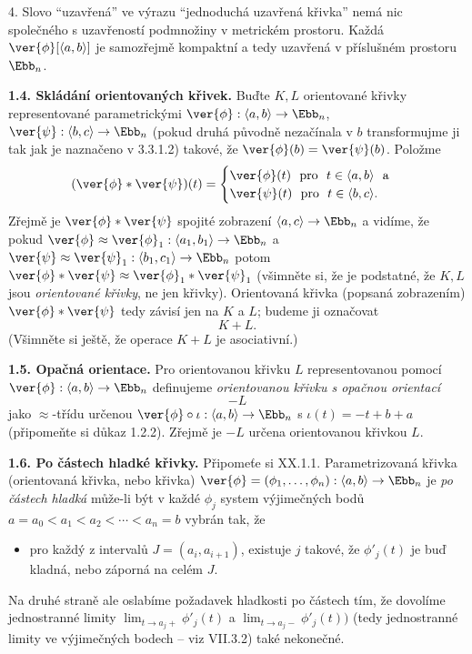 \documentclass[12pt]{article}
\begin{document}
 4. Slovo ``uzavřená'' ve výrazu  ``jednoduchá uzavřená křivka'' nemá nic společného s uzavřeností podmnožiny v metrickém prostoru. Každá
$\ver{\phi}[\langle a,b\rangle]$ je samozřejmě kompaktní a tedy uzavřená v příslušném prostoru 
$\Ebb_n$.
 
 \bigskip
 
{\bf 1.4. Skládání orientovaných křivek.} Buďte $K,L$ orientované křivky representované parametrickými  $\ver{\phi}:\langle a,b\rangle\to\Ebb_n$, 
  $\ver{\psi}:\langle b,c\rangle\to\Ebb_n$ (pokud druhá původně nezačínala v  $b$ transformujme ji tak jak je naznačeno v 3.3.1.2)
 takové, že $\ver{\phi}(b)=\ver{\psi}(b)$. Položme
    $$
  (\ver{\phi}*\ver{\psi})(t)=\begin{cases}\ver{\phi}(t)\ \ \text{pro}\ \ t\in\langle a,b\rangle\ \ \text{a}\\
                                      \ver{\psi}(t)\ \ \text{pro}\ \ t\in\langle b,c\rangle.
                                      \end{cases}
  $$ 
  Zřejmě je $\ver{\phi}*\ver{\psi}$ spojité zobrazení  $\langle a,c\rangle\to\Ebb_n$ a vidíme, že pokud                    $\ver{\phi}\approx\ver{\phi}_1:\langle a_1,b_1\rangle\to\Ebb_n$ a  
  $\ver{\psi}\approx\ver{\psi}_1:\langle b_1,c_1\rangle\to\Ebb_n$   potom $\ver{\phi}*\ver{\psi}  \approx
  \ver{\phi}_1*\ver{\psi}_1$ (všimněte si, že je podstatné, že $K,L$ jsou {\em orientované křivky}, ne jen křivky).
   Orientovaná křivka (popsaná zobrazením) $\ver{\phi}*\ver{\psi}$  tedy  závisí jen na $K$ a $L$; budeme ji označovat
  $$
  K+L.
  $$
  (Všimněte si ještě, že operace $K+L$ je asociativní.)          
 
 \bigskip
 
{\bf 1.5. Opačná orientace.} Pro orientovanou křivku $L$ representovanou pomocí
$\ver{\phi}:\langle a,b\rangle\to\Ebb_n$ definujeme  {\em orientovanou křivku s opačnou orientací}
$$
-L
$$
jako $\approx$-třídu určenou $\ver{\phi}\circ\iota:\langle a,b\rangle\to\Ebb_n$ s $\iota(t)=-t+b+a$ (připomeňte si důkaz 1.2.2). Zřejmě je $-L$ určena orientovanou křivkou $L$.

\bigskip

{\bf 1.6. Po částech hladké křivky.} Připomeťe si XX.1.1. Parametrizovaná křivka (orientovaná křivka, nebo křivka)
$\ver{\phi}=(\phi_1,\dots,\phi_n):\langle a,b\rangle\to\Ebb_n$ je  {\em po částech hladká}
může-li být v každé $\phi_j$ system výjimečných bodů
$
a=a_0<a_1< a_2<\cdots <a_n=b
$
vybrán tak, že
\begin{itemize}
\item pro každý z intervalů $J=(a_i,a_{i+1})$, existuje $j$ takové, že $\phi'_j(t)$ je buď kladná, nebo záporná na celém $J$.
\end{itemize}
Na druhé straně ale oslabíme požadavek hladkosti po částech tím, že dovolíme jednostranné limity
$\lim_{t\to a_j+}\phi'_j(t)$ a $\lim_{t\to a_j-}\phi'_j(t))$ (tedy jednostranné limity ve výjimečných bodech  -- viz VII.3.2) také nekonečné.
\end{document}
